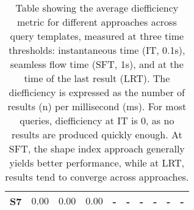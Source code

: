 \begin{table}[h]
{\begin{tabular}{|c|c|c|c||c|c|c||c|c|c|}
        S7 & $\boldsymbol{0.00}$ & $\boldsymbol{0.00}$ & $\boldsymbol{0.00}$ & - & - & - & - & - & - \\
        \hline
    \end{tabular}
    }
    \caption{Table showing the average diefficiency metric for different approaches across query templates, measured at three time thresholds: instantaneous time (IT, 0.1s), seamless flow time (SFT, 1s), and at the time of the last result (LRT).
    The diefficiency is expressed as the number of results (n) per millisecond (ms).
    For most queries, diefficiency at IT is 0, as no results are produced quickly enough.
    At SFT, the shape index approach generally yields better performance, while at LRT, results tend to converge across approaches.}
	\label{tab:dief}
\end{table}
    